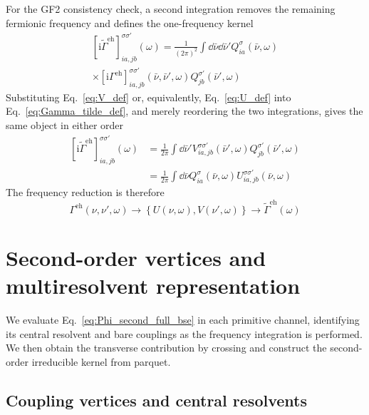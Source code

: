 \documentclass[aip,jcp,reprint,noshowkeys,superscriptaddress]{revtex4-1}
\newcommand{\ii}{\mathrm{i}}
\newcommand{\eh}{\text{eh}}
\begin{document}
For the GF2 consistency check, a second integration removes the remaining
fermionic frequency and defines the one-frequency kernel
\begin{multline}
	\left[
	\ii\widetilde{\Gamma}^\eh
	\right]^{\sigma\sigma'}_{ia,jb}(\omega)
	=
	\frac{1}{(2\pi)^2}
	\int \dd{\bar\nu}\dd{\bar\nu'}
	Q^\sigma_{ia}(\bar\nu,\omega)
	\\
	\times
	\left[
	\ii\Gamma^\eh
	\right]^{\sigma\sigma'}_{ia,jb}(\bar\nu,\bar\nu',\omega)
	Q^{\sigma'}_{jb}(\bar\nu',\omega)
	\label{eq:Gamma_tilde_def}
\end{multline}
Substituting Eq.~\eqref{eq:V_def} or, equivalently,
Eq.~\eqref{eq:U_def} into Eq.~\eqref{eq:Gamma_tilde_def}, and merely
reordering the two integrations, gives the same object in either order
\begin{align}
	\left[
	\ii\widetilde{\Gamma}^\eh
	\right]^{\sigma\sigma'}_{ia,jb}(\omega)
	&=
	\frac{1}{2\pi}
	\int \dd{\bar\nu'}
	V^{\sigma\sigma'}_{ia,jb}(\bar\nu',\omega)
	Q^{\sigma'}_{jb}(\bar\nu',\omega)
	\label{eq:Gamma_tilde_from_V}
	\\
	&=
	\frac{1}{2\pi}
	\int \dd{\bar\nu}
	Q^\sigma_{ia}(\bar\nu,\omega)
	U^{\sigma\sigma'}_{ia,jb}(\bar\nu,\omega)
	\label{eq:Gamma_tilde_from_U}
\end{align}
The frequency reduction is therefore
\begin{equation}
	\Gamma^\eh(\nu,\nu',\omega)
	\longrightarrow
	\left\{
	U(\nu,\omega),V(\nu',\omega)
	\right\}
	\longrightarrow
	\widetilde{\Gamma}^\eh(\omega)
	\label{eq:frequency_reduction}
\end{equation}

\section{Second-order vertices and multiresolvent representation}
\label{sec:second_order_primitives}
\label{sec:second_order_multiresolvent}

We evaluate Eq.~\eqref{eq:Phi_second_full_bse} in each primitive channel,
identifying its central resolvent and bare couplings as the frequency
integration is performed. We then obtain the transverse contribution by
crossing and construct the second-order irreducible kernel from parquet.

\subsection{Coupling vertices and central resolvents}
\label{sec:target_representation}
\end{document}
